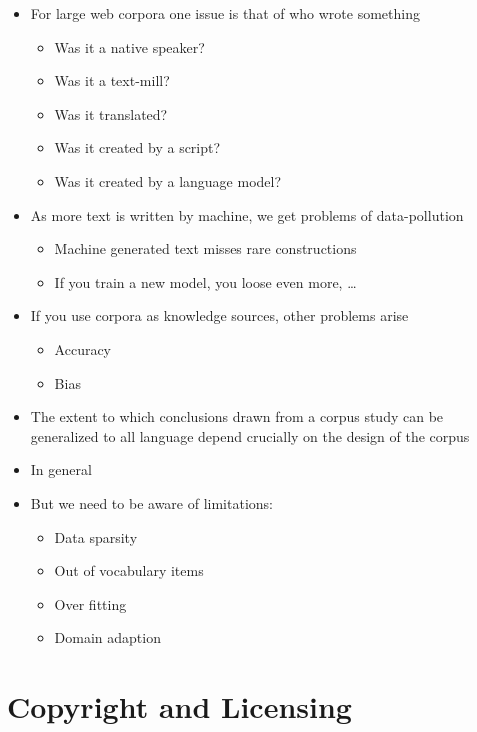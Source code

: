 \documentclass[a4paper,landscape,headrule,footrule,xetex]{foils}
\begin{document}
\begin{itemize}
\item For large web corpora one issue is that of who wrote something
  \begin{itemize}
  \item Was it a native speaker?
  \item Was it a text-mill?
  \item Was it translated?
  \item Was it created by a script?
  \item Was it created by a language model?
  \end{itemize}
\item As more text is written by machine, we get problems of
  data-pollution
  \begin{itemize}
  \item Machine generated text misses rare constructions
  \item If you train a new model, you loose even more, \ldots 
  \end{itemize}
\item If you use corpora as knowledge sources, other problems arise
  \begin{itemize}
  \item Accuracy
  \item Bias
  \end{itemize}
\end{itemize}


\begin{itemize}
\item The extent to which conclusions drawn from a corpus study can be
  generalized to all language depend crucially on the design of
  the corpus

\item In general 
\item But we need to be aware of limitations:
  \begin{itemize}
  \item Data sparsity
  \item Out of vocabulary items
  \item Over fitting
  \item Domain adaption
  \end{itemize}
\end{itemize}


\section{Copyright and Licensing}
\end{document}

